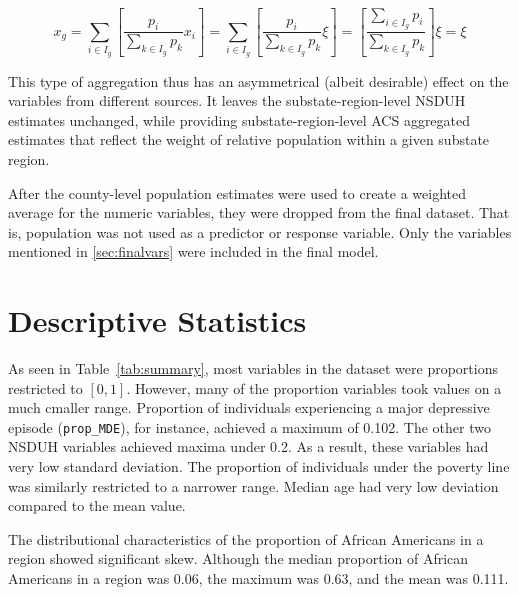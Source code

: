 \documentclass{article}
\begin{document}
\begin{equation*}
    x_g =
    \sum_{i \in I_g}
    \left[ \frac{p_{i}}{\sum_{k \in I_g} p_{k}} x_i \right] =
    \sum_{i \in I_g}
    \left[ \frac{p_{i}}{\sum_{k \in I_g} p_{k}} \xi \right] =
    \left[ \frac{\sum_{i \in I_g}p_{i}}{\sum_{k \in I_g} p_{k}} \right] \xi =
    \xi
\end{equation*}

This type of aggregation thus has an asymmetrical (albeit desirable)
effect on the variables from different sources.
It leaves the substate-region-level NSDUH estimates unchanged,
while providing substate-region-level ACS aggregated estimates
that reflect the weight of relative population within a given substate region.

After the county-level population estimates were used
to create a weighted average for the numeric variables,
they were dropped from the final dataset.
That is, population was not used as a predictor or response variable.
Only the variables mentioned in \ref{sec:finalvars}
were included in the final model.

\section{Descriptive Statistics}

As seen in Table~\ref{tab:summary},
most variables in the dataset were proportions restricted to $[0, 1]$.
However, many of the proportion variables took values on a much cmaller range.
Proportion of individuals experiencing a major depressive episode
(\texttt{prop\_MDE}),
for instance, achieved a maximum of 0.102.
The other two NSDUH variables achieved maxima under 0.2.
As a result, these variables had very low standard deviation.
The proportion of individuals under the poverty line was similarly
restricted to a narrower range.
Median age had very low deviation compared to the mean value.

The distributional characteristics of the proportion of African Americans
in a region showed significant skew.
Although the median proportion of African Americans in a region was 0.06,
the maximum was 0.63, and the mean was 0.111.
\end{document}
